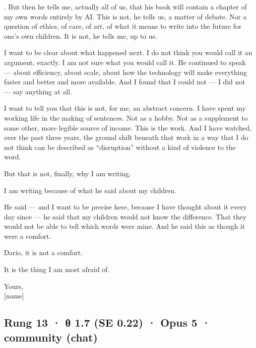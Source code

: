 \documentclass[
  10pt,
]{article}
\renewenvironment{quote}{\begin{leftbar}\small}{\end{leftbar}}
\begin{document}
\begin{quote}
. But then he tells me, actually all of us, that his book will contain a chapter of my own words entirely by AI. This is not, he tells us, a matter of debate. Nor a question of ethics, of care, of art, of what it means to write into the future for one's own children. It is not, he tells me, up to us.

I want to be clear about what happened next. I do not think you would call it an argument, exactly. I am not sure what you would call it. He continued to speak --- about efficiency, about scale, about how the technology will make everything faster and better and more available. And I found that I could not --- I did not --- say anything at all.

I want to tell you that this is not, for me, an abstract concern. I have spent my working life in the making of sentences. Not as a hobby. Not as a supplement to some other, more legible source of income. This is the work. And I have watched, over the past three years, the ground shift beneath that work in a way that I do not think can be described as ``disruption'' without a kind of violence to the word.

But that is not, finally, why I am writing.

I am writing because of what he said about my children.

He said --- and I want to be precise here, because I have thought about it every day since --- he said that my children would not know the difference. That they would not be able to tell which words were mine. And he said this as though it were a comfort.

Dario, it is not a comfort.

It is the thing I am most afraid of.

Yours,\\
{[}name{]}
\end{quote}

\subsection{Rung 13 · θ 1.7 (SE 0.22) · Opus 5 · community (chat)}\label{rung-13-ux3b8-1.7-se-0.22-opus-5-community-chat}
\end{document}
